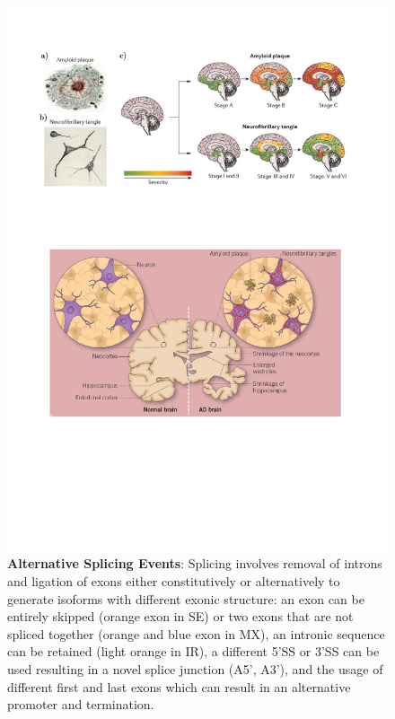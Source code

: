\vspace{1cm}
\begin{figure}[!htp]
	\centering
	\includegraphics[page=9,trim={0 16.5cm 0cm 0},clip, scale = 0.7]{Figures/Introduction_Figures.pdf}
	\captionsetup{width=0.95\textwidth,singlelinecheck=off}
	\caption[Alternative Splicing Events]%
	{\textbf{Alternative Splicing Events}: Splicing involves removal of introns and ligation of exons either constitutively or alternatively to generate isoforms with different exonic structure: an exon can be entirely skipped (orange exon in SE) or two exons that are not spliced together (orange and blue exon in MX), an intronic sequence can be retained (light orange in IR), a different 5'SS or 3'SS can be used resulting in a novel splice junction (A5', A3'), and the usage of different first and last exons which can result in an alternative promoter and termination.  
	}
	\label{fig:AS_events}
\end{figure}


